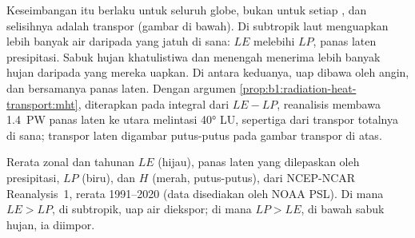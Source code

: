 Keseimbangan itu berlaku untuk seluruh globe, bukan untuk setiap , dan selisihnya adalah transpor (gambar di bawah). Di subtropik laut menguapkan lebih banyak air daripada yang jatuh di sana: $LE$ melebihi $LP$, panas laten presipitasi. Sabuk hujan khatulistiwa dan  menengah menerima lebih banyak hujan daripada yang mereka uapkan. Di antara keduanya, uap dibawa oleh angin, dan bersamanya panas laten. Dengan argumen \cref{prop:b1:radiation-heat-transport:mht}, diterapkan pada integral dari $LE - LP$, reanalisis membawa \qty{1.4}{PW} panas laten ke utara melintasi \ang{40} LU, sepertiga dari transpor totalnya di sana; transpor laten digambar putus-putus pada gambar transpor di atas.

\begin{omfigure}

{\small Rerata zonal dan tahunan  $LE$ (hijau), panas laten yang dilepaskan oleh presipitasi, $LP$ (biru), dan  $H$ (merah, putus-putus), dari NCEP-NCAR Reanalysis~1, rerata 1991--2020 (data disediakan oleh NOAA PSL). Di mana $LE > LP$, di subtropik, uap air diekspor; di mana $LP > LE$, di bawah sabuk hujan, ia diimpor.}
\label{fig:b1:radiation-heat-transport:surface}
\end{omfigure}


